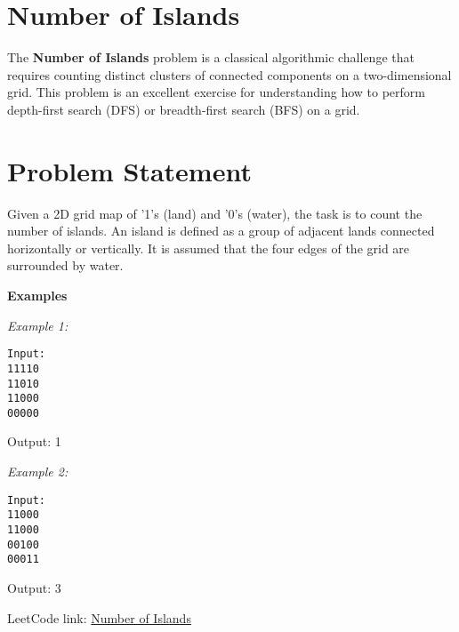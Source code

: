 
\section{Number of Islands}
\label{sec:Number_of_Islands}
    
The \textbf{Number of Islands} problem is a classical algorithmic challenge that requires counting distinct clusters of connected components on a two-dimensional grid. This problem is an excellent exercise for understanding how to perform depth-first search (DFS) or breadth-first search (BFS) on a grid.
    
\section*{Problem Statement}
    
Given a 2D grid map of '1's (land) and '0's (water), the task is to count the number of islands. An island is defined as a group of adjacent lands connected horizontally or vertically. It is assumed that the four edges of the grid are surrounded by water.
    
\textbf{Examples}
    
\textit{Example 1:}
    
\begin{verbatim}
Input:
11110
11010
11000
00000
\end{verbatim}
    
Output: 1
    
\textit{Example 2:}
    
\begin{verbatim}
Input:
11000
11000
00100
00011
\end{verbatim}
    
Output: 3
    
LeetCode link: \href{https://leetcode.com/problems/number-of-islands/}{Number of Islands}
    

